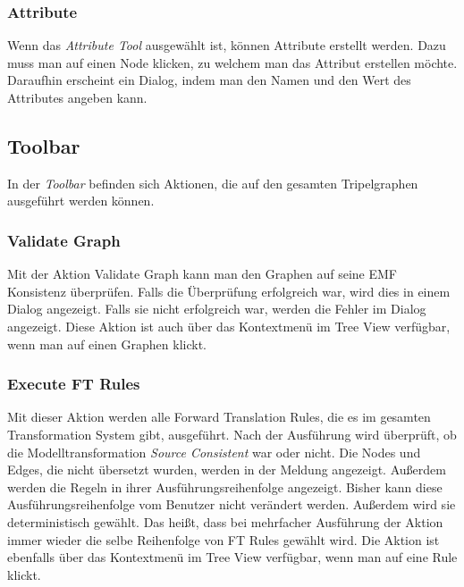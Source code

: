 \subsubsection{Attribute}
\label{subsubsec:Graph_View-Attribute}
Wenn das \emph{Attribute Tool} ausgewählt ist, können Attribute erstellt werden. Dazu muss man auf einen Node klicken, zu welchem man das Attribut erstellen möchte. Daraufhin erscheint ein Dialog, indem man den Namen und den Wert des Attributes angeben kann.

\subsection{Toolbar}
In der \emph{Toolbar} befinden sich Aktionen, die auf den gesamten Tripelgraphen ausgeführt werden können.

\subsubsection{Validate Graph}
Mit der Aktion Validate Graph kann man den Graphen auf seine EMF Konsistenz überprüfen. Falls die Überprüfung erfolgreich war, wird dies in einem Dialog angezeigt. Falls sie nicht erfolgreich war, werden die Fehler im Dialog angezeigt. Diese Aktion ist auch über das Kontextmenü im Tree View verfügbar, wenn man auf einen Graphen klickt.

\subsubsection{Execute FT Rules}
Mit dieser Aktion werden alle Forward Translation Rules, die es im gesamten Transformation System gibt, ausgeführt. Nach der Ausführung wird überprüft, ob die Modelltransformation \emph{Source Consistent} war oder nicht. Die Nodes und Edges, die nicht übersetzt wurden, werden in der Meldung angezeigt. Außerdem werden die Regeln in ihrer Ausführungsreihenfolge angezeigt. Bisher kann diese Ausführungsreihenfolge vom Benutzer nicht verändert werden. Außerdem wird sie deterministisch gewählt. Das heißt, dass bei mehrfacher Ausführung der Aktion immer wieder die selbe Reihenfolge von FT Rules gewählt wird. Die Aktion ist ebenfalls über das Kontextmenü im Tree View verfügbar, wenn man auf eine Rule klickt.


